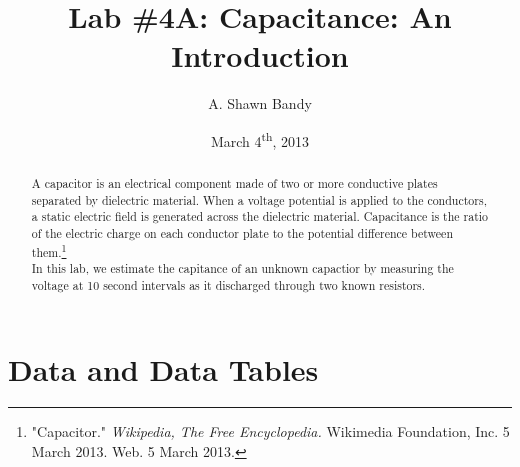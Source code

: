 \documentclass{article}
\begin{document}
\title{Lab \#4A:  Capacitance: An Introduction}
\author{A. Shawn Bandy}
\date{March 4\textsuperscript{th}, 2013}
\maketitle
\begin{abstract}
A capacitor is an electrical component made of two or more conductive plates separated by dielectric material.  When a voltage potential is applied to the conductors, a static electric field is generated across the dielectric material.  Capacitance is the ratio of the electric charge on each conductor plate to the potential difference between them.\footnote{"Capacitor." {\it{Wikipedia, The Free Encyclopedia.}} Wikimedia Foundation, Inc. 5 March 2013. Web. 5 March 2013.}  \\

In this lab, we estimate the capitance of an unknown capactior by measuring the voltage at 10 second intervals as it discharged through two known resistors.  
\end{abstract}
\section{Data and Data Tables}
\end{document}
